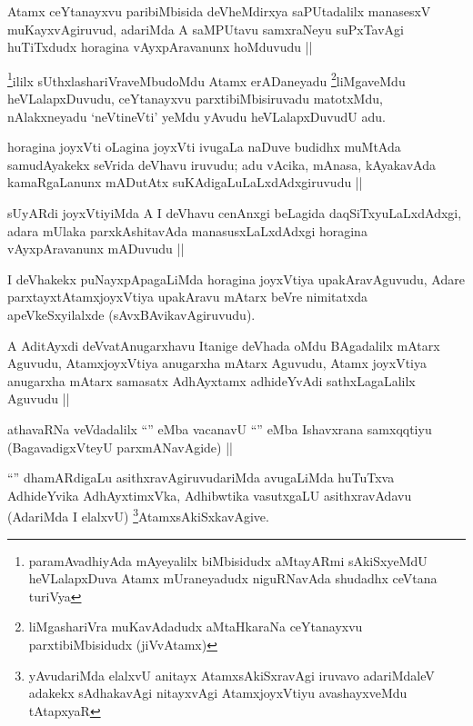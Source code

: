 \begin{artha}
Atamx ceYtanayxvu paribiMbisida deVheMdirxya saPUtadalilx manasesxV muKayxvAgiruvud, adariMda A saMPUtavu samxraNeyu suPxTavAgi huTiTxdudx horagina vAyxpAravanunx hoMduvudu ||
\end{artha}

\begin{artha}
\footnote{paramAvadhiyAda mAyeyalilx biMbisidudx aMtayARmi sAkiSxyeMdU heVLalapxDuva Atamx mUraneyadudx niguRNavAda shudadhx  ceVtana turiVya}ililx sUthxlashariVraveMbudoMdu Atamx erADaneyadu \footnote{liMgashariVra muKavAdadudx aMtaHkaraNa ceYtanayxvu parxtibiMbisidudx (jiVvAtamx)}liMgaveMdu heVLalapxDuvudu, ceYtanayxvu parxtibiMbisiruvadu matotxMdu, nAlakxneyadu `neVtineVti' yeMdu yAvudu heVLalapxDuvudU adu.
\end{artha}

\begin{artha}
horagina joyxVti oLagina joyxVti ivugaLa naDuve budidhx muMtAda samudAyakekx seVrida deVhavu iruvudu; adu vAcika, mAnasa, kAyakavAda kamaRgaLanunx mADutAtx suKAdigaLuLaLxdAdxgiruvudu ||
\end{artha}

\begin{artha}
sUyARdi joyxVtiyiMda A I deVhavu cenAnxgi beLagida daqSiTxyuLaLxdAdxgi, adara mUlaka parxkAshitavAda manasusxLaLxdAdxgi horagina vAyxpAravanunx mADuvudu ||
\end{artha}

\begin{artha}
I deVhakekx puNayxpApagaLiMda horagina joyxVtiya upakAravAguvudu, Adare parxtayxtAtamxjoyxVtiya upakAravu mAtarx beVre nimitatxda apeVkeSxyilalxde (sAvxBAvikavAgiruvudu).
\end{artha}

\begin{artha}
A AditAyxdi deVvatAnugarxhavu Itanige deVhada oMdu BAgadalilx mAtarx Aguvudu, AtamxjoyxVtiya anugarxha mAtarx Aguvudu, Atamx joyxVtiya anugarxha mAtarx samasatx AdhAyxtamx adhideYvAdi sathxLagaLalilx Aguvudu || 
\end{artha}

\begin{artha}
athavaRNa veVdadalilx ``\stext'' eMba vacanavU ``\stext'' eMba Ishavxrana samxqqtiyu (BagavadigxVteyU parxmANavAgide) ||
\end{artha}

\begin{artha}
``\stext'' dhamARdigaLu asithxravAgiruvudariMda avugaLiMda huTuTxva AdhideYvika AdhAyxtimxVka, Adhibwtika vasutxgaLU asithxravAdavu (AdariMda I elalxvU) \footnote{yAvudariMda elalxvU anitayx AtamxsAkiSxravAgi iruvavo adariMdaleV adakekx sAdhakavAgi nitayxvAgi AtamxjoyxVtiyu avashayxveMdu tAtapxyaR}AtamxsAkiSxkavAgive.
\end{artha}

